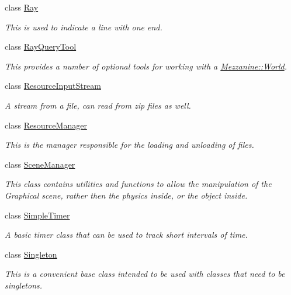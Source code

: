 \begin{DoxyCompactItemize}
class \hyperlink{classMezzanine_1_1Ray}{Ray}
\begin{DoxyCompactList}\small\item\em This is used to indicate a line with one end. \item\end{DoxyCompactList}\item 
class \hyperlink{classMezzanine_1_1RayQueryTool}{RayQueryTool}
\begin{DoxyCompactList}\small\item\em This provides a number of optional tools for working with a \hyperlink{classMezzanine_1_1World}{Mezzanine::World}. \item\end{DoxyCompactList}\item 
class \hyperlink{classMezzanine_1_1ResourceInputStream}{ResourceInputStream}
\begin{DoxyCompactList}\small\item\em A stream from a file, can read from zip files as well. \item\end{DoxyCompactList}\item 
class \hyperlink{classMezzanine_1_1ResourceManager}{ResourceManager}
\begin{DoxyCompactList}\small\item\em This is the manager responsible for the loading and unloading of files. \item\end{DoxyCompactList}\item 
class \hyperlink{classMezzanine_1_1SceneManager}{SceneManager}
\begin{DoxyCompactList}\small\item\em This class contains utilities and functions to allow the manipulation of the Graphical scene, rather then the physics inside, or the object inside. \item\end{DoxyCompactList}\item 
class \hyperlink{classMezzanine_1_1SimpleTimer}{SimpleTimer}
\begin{DoxyCompactList}\small\item\em A basic timer class that can be used to track short intervals of time. \item\end{DoxyCompactList}\item 
class \hyperlink{classMezzanine_1_1Singleton}{Singleton}
\begin{DoxyCompactList}\small\item\em This is a convenient base class intended to be used with classes that need to be singletons. \item\end{DoxyCompactList}\item 

\end{DoxyCompactItemize}
